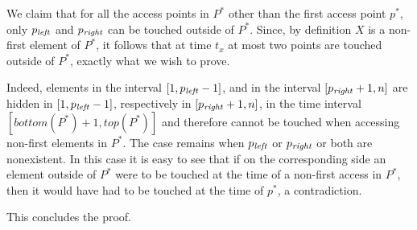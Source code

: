 We claim that for all the access points in $P^*$ other than the first access point $p^*$, only $p_{\mathit{left}}$ and $p_{\mathit{right}}$ can be touched outside of $P^*$. Since, by definition $X$ is a non-first element of $P^*$, it follows that at time $t_x$ at most two points are touched outside of $P^*$, exactly what we wish to prove.

Indeed, elements in the interval $[1, p_{\mathit{left}}-1]$, and in the interval $[p_{\mathit{right}}+1, n]$ are hidden in $[1, p_{\mathit{left}}-1]$, respectively in $[p_{\mathit{right}}+1, n]$, in the time interval $[\textit{bottom}(P^*)+1, \textit{top}(P^*)]$ and therefore cannot be touched when accessing non-first elements in $P^*$. The case remains when $p_{\mathit{left}}$ or $p_{\mathit{right}}$ or both are nonexistent. In this case it is easy to see that if on the corresponding side an element outside of $P^*$ were to be touched at the time of a non-first access in $P^*$, then it would have had to be touched at the time of $p^*$, a contradiction.

This concludes the proof.
